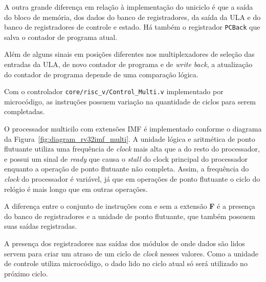         { A outra grande diferença em relação à implementação do uniciclo é que a
            saída do bloco de memória, dos dados do banco de registradores, da saída
            da ULA e do banco de registradores de controle e estado. Há também
            o registrador \texttt{PCBack} que salva o contador de programa atual.
        }

        { Além de alguns sinais em posições diferentes nos multiplexadores de seleção
            das entradas da ULA, de novo contador de programa e de \textit{write back},
            a atualização do contador de programa depende de uma comparação lógica.
        }

        { Com o controlador \texttt{core/risc\_v/Control\_Multi.v} implementado
            por microcódigo, as instruções possuem variação na quantidade de
            ciclos para serem completadas.
        }

        { O processador multicilo com extensões IMF é implementado conforme o
            diagrama da Figura~\ref{fig:diagram_rv32imf_multi}. A unidade lógica
            e aritmética de ponto flutuante utiliza uma frequência de \textit{clock}
            mais alta que a do resto do processador, e possui um sinal de
            \textit{ready} que causa o \textit{stall} do clock principal do
            processador enquanto a operação de ponto flutuante não completa.
            Assim, a frequência do \textit{clock} do processador é variável, já
            que em operações de ponto flutuante o ciclo do relógio é mais longo
            que em outras operações.
        }

        { A diferença entre o conjunto de instruções com e sem a extensão \textbf{F}
            é a presença do banco de registradores e a unidade de ponto flutuante,
            que também possuem suas saídas registradas.
        }

        { A presença dos registradores nas saídas dos módulos de onde dados são
            lidos servem para criar um atraso de um ciclo de \textit{clock} nesses
            valores. Como a unidade de controle utiliza microcódigo, o dado lido
            no ciclo atual só será utilizado no próximo ciclo.
        }

